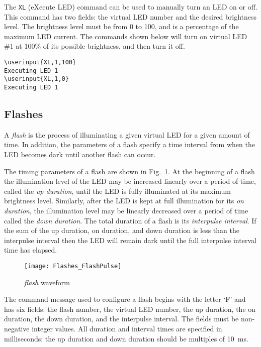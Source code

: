 \documentclass[letterpaper,11pt]{article}
\newcommand\userinput[1]{\textbf{#1}}
\begin{document}
The \texttt{XL} (eXecute LED) command can be used to manually turn an LED on
or off. This command has two fields: the virtual LED number and the desired
brightness level. The brightness level must be from 0 to 100, and is a
percentage of the maximum LED current. The commands shown below will turn
on virtual LED \#1 at 100\% of its possible brightness, and then turn it off.
\begin{tcolorbox}
\begin{Verbatim}[commandchars=\\\{\}]
\userinput{XL,1,100}
Executing LED 1
\userinput{XL,1,0}
Executing LED 1
\end{Verbatim}
\end{tcolorbox}

\subsection*{Flashes}

A \textit{flash} is the process of illuminating a given virtual LED for a
given amount of time. In addition, the parameters of a flash specify a time
interval from when the LED becomes dark until another flash can occur.

The timing parameters of a flash are shown in Fig.\ \ref{fig:FlashPulse}.
At the beginning of a flash the illumination level of the LED may be
increased linearly over a period of time, called the \textit{up duration},
until the LED is fully illuminated at its maximum brightness level. Similarly,
after the LED is kept at full illumination for its \textit{on duration}, the
illumination level may be linearly decreased over a period of time called
the \textit{down duration}. The total duration of a flash is its
\textit{interpulse interval}. If the sum of the up duration, on duration, and
down duration is less than the interpulse interval then the LED will remain
dark until the full interpulse interval time has elapsed.

\begin{figure}[h]
  \begin{center}
    \texttt{[image: Flashes\_FlashPulse]}
  \end{center}
  \vspace{-18pt}
  \caption{\textit{flash} waveform}
  \label{fig:FlashPulse}
\end{figure}

The command message used to configure a flash begins with the letter `F'
and has six fields: the flash number, the virtual LED number, the up
duration, the on duration, the down duration, and the interpulse interval.
The fields must be non-negative integer values. All duration and interval times
are specified in milliseconds; the up duration and down duration should be
multiples of \SI{10}{\ms}.
\end{document}
